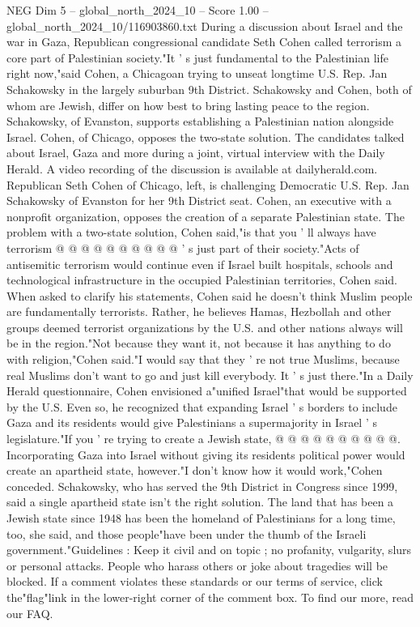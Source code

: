 \begin{textsample}{NEG Dim 5 – global\_north\_2024\_10 – Score 1.00 – global\_north\_2024\_10/116903860.txt}  \label{ex:f5_neg_043}
During a discussion about Israel and the war in Gaza, Republican congressional candidate Seth Cohen called terrorism a core part of Palestinian society."It ' s just fundamental to the Palestinian life right now,"said Cohen, a Chicagoan trying to unseat longtime U.S.
Rep.
Jan Schakowsky in the largely suburban 9th District.
Schakowsky and Cohen, both of whom are Jewish, differ on how best to bring lasting peace to the region.
Schakowsky, of Evanston, supports establishing a Palestinian nation alongside Israel.
Cohen, of Chicago, opposes the two-state solution.
The candidates talked about Israel, Gaza and more during a joint, virtual interview with the Daily Herald.
A video recording of the discussion is available at dailyherald.com.
Republican Seth Cohen of Chicago, left, is challenging Democratic U.S.
Rep.
Jan Schakowsky of Evanston for her 9th District seat.
Cohen, an executive with a nonprofit organization, opposes the creation of a separate Palestinian state.
The problem with a two-state solution, Cohen said,"is that you ' ll always have terrorism @ @ @ @ @ @ @ @ @ @ ' s just part of their society."Acts of antisemitic terrorism would continue even if Israel built hospitals, schools and technological infrastructure in the occupied Palestinian territories, Cohen said.
When asked to clarify his statements, Cohen said he doesn't think Muslim people are fundamentally terrorists.
Rather, he believes Hamas, Hezbollah and other groups deemed terrorist organizations by the U.S. and other nations always will be in the region."Not because they want it, not because it has anything to do with religion,"Cohen said."I would say that they ' re not true Muslims, because real Muslims don't want to go and just kill everybody.
It ' s just there."In a Daily Herald questionnaire, Cohen envisioned a"unified Israel"that would be supported by the U.S.
Even so, he recognized that expanding Israel ' s borders to include Gaza and its residents would give Palestinians a supermajority in Israel ' s legislature."If you ' re trying to create a Jewish state, @ @ @ @ @ @ @ @ @ @.
Incorporating Gaza into Israel without giving its residents political power would create an apartheid state, however."I don't know how it would work,"Cohen conceded.
Schakowsky, who has served the 9th District in Congress since 1999, said a single apartheid state isn't the right solution.
The land that has been a Jewish state since 1948 has been the homeland of Palestinians for a long time, too, she said, and those people"have been under the thumb of the Israeli government."Guidelines : Keep it civil and on topic ; no profanity, vulgarity, slurs or personal attacks.
People who harass others or joke about tragedies will be blocked.
If a comment violates these standards or our terms of service, click the"flag"link in the lower-right corner of the comment box.
To find our more, read our FAQ.

\end{textsample}
